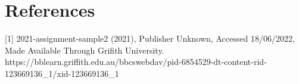 \documentclass{article}
\begin{document}
	\section{References}\label{sec:references}
	[1] 2021-assignment-sample2 (2021), Publisher Unknown, Accessed 18/06/2022, Made Available Through Grifith University. 
https://bblearn.griffith.edu.au/bbcswebdav/pid-6854529-dt-content-rid-123669136\_1/xid-123669136\_1 

    
    
\end{document}
